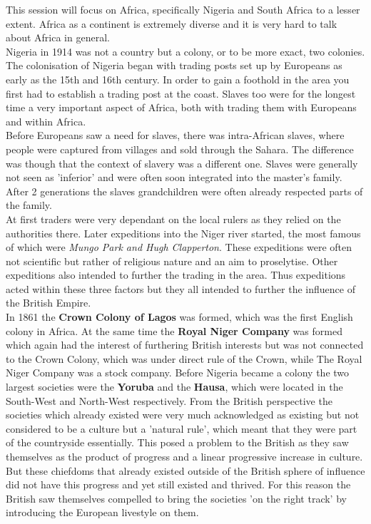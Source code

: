 \documentclass{article}
\begin{document}
	This session will focus on Africa, specifically Nigeria and South Africa to a lesser extent. Africa as a continent is extremely diverse and it is very hard to talk about Africa in general. \\
	Nigeria in 1914 was not a country but a colony, or to be more exact, two colonies. The colonisation of Nigeria began with trading posts set up by Europeans as early as the 15th and 16th century. In order to gain a foothold in the area you first had to establish a trading post at the coast. Slaves too were for the longest time a very important aspect of Africa, both with trading them with Europeans and within Africa. \\
	Before Europeans saw a need for slaves, there was intra-African slaves, where people were captured from villages and sold through the Sahara. The difference was though that the context of slavery was a different one. Slaves were generally not seen as 'inferior' and were often soon integrated into the master's family. After 2 generations the slaves grandchildren were often already respected parts of the family. \\
	At first traders were very dependant on the local rulers as they relied on the authorities there. Later expeditions into the Niger river started, the most famous of which were \textit{Mungo Park and Hugh Clapperton}. These expeditions were often not scientific but rather of religious nature and an aim to proselytise. Other expeditions also intended to further the trading in the area. Thus expeditions acted within these three factors but they all intended to further the influence of the British Empire. \\
	In 1861 the \textbf{Crown Colony of Lagos} was formed, which was the first English colony in Africa. At the same time the \textbf{Royal Niger Company} was formed which again had the interest of furthering British interests but was not connected to the Crown Colony, which was under direct rule of the Crown, while The Royal Niger Company was a stock company. Before Nigeria became a colony the two largest societies were the \textbf{Yoruba} and the \textbf{Hausa}, which were located in the South-West and North-West respectively. From the British perspective the societies which already existed were very much acknowledged as existing but not considered to be a culture but a 'natural rule', which meant that they were part of the countryside essentially. This posed a problem to the British as they saw themselves as the product of progress and a linear progressive increase in culture. But these chiefdoms that already existed outside of the British sphere of influence did not have this progress and yet still existed and thrived. For this reason the British saw themselves compelled to bring the societies 'on the right track' by introducing the European livestyle on them. \\
\end{document}
